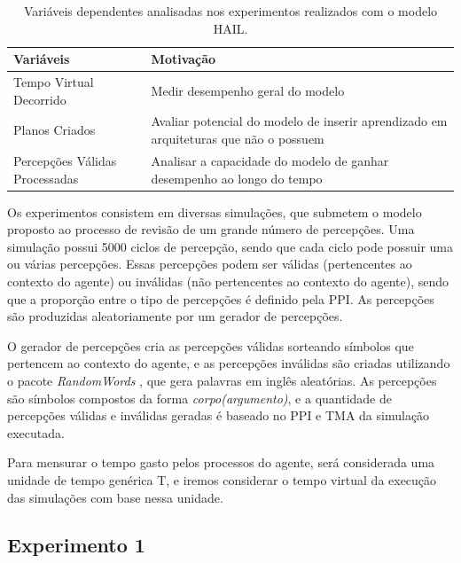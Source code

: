 \begin{table}[h!]
    \begin{center}
        \caption{ Variáveis dependentes analisadas nos experimentos realizados com o modelo HAIL. }
        \label{table:experiments_variables}
        \begin{tabularx}{\textwidth}{ |Y|Y| }
            \hline
            \textbf{Variáveis} & \textbf{Motivação} \\
            \hline
            Tempo Virtual Decorrido & Medir desempenho geral do modelo \\
            \hline
            Planos Criados & Avaliar potencial do modelo de inserir aprendizado em arquiteturas que não o possuem \\
            \hline
            Percepções Válidas Processadas & Analisar a capacidade do modelo de ganhar desempenho ao longo do tempo\\
            \hline
        \end{tabularx}{}
    \end{center}{}
\end{table}

Os experimentos consistem em diversas simulações, que submetem o modelo proposto ao processo de revisão de um grande número de percepções. Uma simulação possui 5000 ciclos de percepção, sendo que cada ciclo pode possuir uma ou várias percepções. Essas percepções podem ser válidas (pertencentes ao contexto do agente) ou inválidas (não pertencentes ao contexto do agente), sendo que a proporção entre o tipo de percepções é definido pela PPI. As percepções são produzidas aleatoriamente por um gerador de percepções. 

O gerador de percepções cria as percepções válidas sorteando símbolos que pertencem ao contexto do agente, e as percepções inválidas são criadas utilizando o pacote \emph{RandomWords} \cite{pipRandomWords2}, que gera palavras em inglês aleatórias. As percepções são símbolos compostos da forma \emph{corpo(argumento)}, e a quantidade de percepções válidas e inválidas geradas é baseado no PPI e TMA da simulação executada.

Para mensurar o tempo gasto pelos processos do agente, será considerada uma unidade de tempo genérica T, e iremos considerar o tempo virtual da execução das simulações com base nessa unidade.

\subsection{Experimento 1}

